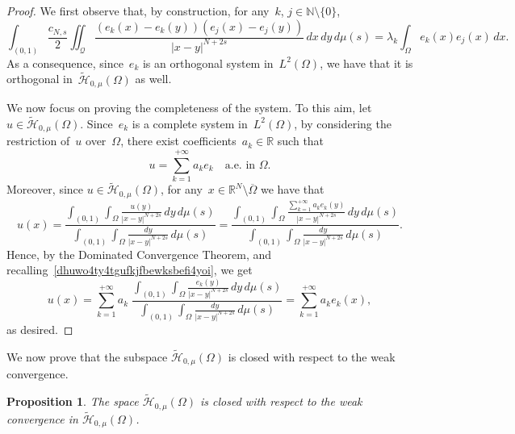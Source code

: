 \documentclass[12pt,a4paper,intlimits,sumlimits]{amsart}
\def \N {\mathbb{N}}
\def \R {\mathbb{R}}
\def \Q {\mathcal Q}
\theoremstyle{definition}
\theoremstyle{plain}
\newtheorem{proposition}[definition]{Proposition}
\numberwithin{equation}{section}
\begin{document}
\begin{proof}
We first observe that, by construction,
for any~$k$, $j\in\N\setminus\{0\}$,
\[
\int_{(0,1)}\frac{c_{N, s}}{2}\iint_\Q\frac{(e_k(x)-e_k(y))(e_j(x)-e_j(y))}{|x-y|^{N+2s}}\,dx\,dy\,d\mu(s)=\lambda_k \int_\Omega e_k(x) e_j(x)\,dx.
\]
As a consequence, since~$e_k$ is an orthogonal system in~$L^2(\Omega)$, we have that it is orthogonal in~$\widetilde{\mathcal H}_{0, \mu}(\Omega)$ as well.

We now focus on proving the completeness of the system. To this aim,
let~$u\in \widetilde{\mathcal H}_{0, \mu}(\Omega)$. Since~$e_k$ is a complete system in~$L^2(\Omega)$, by considering the restriction of~$u$ over~$\Omega$, there exist coefficients~$a_k\in\R$ such that
\[
u=\sum_{k=1}^{+\infty}a_ke_k \quad \mbox{a.e. in } \Omega.
\]
Moreover, since $u\in \widetilde{\mathcal H}_{0, \mu}(\Omega)$, for any~$x\in \R^N\setminus \overline{\Omega}$ we have that
\[
u(x)=
\dfrac{\displaystyle \int_{(0,1)}\int_\Omega \frac{u(y)}{|x-y|^{N+2s}}\,dy\,d\mu(s)}{\displaystyle \int_{(0,1)}\int_\Omega \frac{dy}{|x-y|^{N+2s}}\,d\mu(s)}
=\dfrac{\displaystyle \int_{(0,1)}\int_\Omega \frac{\sum_{k=1}^{+\infty}a_ke_k(y)}{|x-y|^{N+2s}}\,dy\,d\mu(s)}{\displaystyle \int_{(0,1)}\int_\Omega \frac{dy}{|x-y|^{N+2s}}\,d\mu(s)}.
\]
Hence, by the Dominated Convergence Theorem, and
recalling~\eqref{dhuwo4ty4tgufkjfbewksbefi4yoi}, we get
\[
u(x)=\sum_{k=1}^{+\infty}a_k\;\dfrac{\displaystyle \int_{(0,1)}\int_\Omega \frac{e_k(y)}{|x-y|^{N+2s}}\,dy\,d\mu(s)}{\displaystyle \int_{(0,1)}\int_\Omega \frac{dy}{|x-y|^{N+2s}}\,d\mu(s)}
=\sum_{k=1}^{+\infty}a_k e_k(x),
\]
as desired.
\end{proof}

We now prove that the subspace $\widetilde{\mathcal H}_{0, \mu}(\Omega)$ is closed with 
respect to the weak convergence.

\begin{proposition}\label{chiusoconvergenzadebole}
The space $\widetilde{\mathcal H}_{0, \mu}(\Omega)$ is closed
with respect to the weak convergence in 
$\widetilde{\mathcal H}_{0, \mu}(\Omega)$.
\end{proposition}
\end{document}
